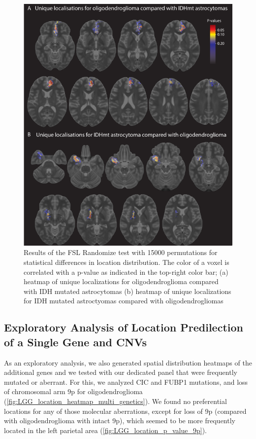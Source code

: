 \begin{figure}[htbp]
    \centering
    \includegraphics[width=\textwidth]{Figures/p_value_oligo_astro.png}
    \caption{Results of the FSL Randomize test with 15000 permutations for statistical
    differences in location distribution. The color of a voxel is correlated with
    a p-value as indicated in the top-right color bar; (a) heatmap of unique
    localizations for oligodendroglioma compared with IDH mutated astrocytomas (b) heatmap of unique localizations for IDH mutated astroctyomas
    compared with oligodendrogliomas}\label{fig:LGG_location_oligo_astro_p_value}
\end{figure}


\subsection{Exploratory Analysis of Location Predilection of a Single Gene and CNVs}

As an exploratory analysis, we also generated spatial distribution heatmaps of the additional genes and  we tested with our dedicated  panel that were frequently mutated or aberrant.
For this, we analyzed CIC and FUBP1 mutations, and loss of chromosomal arm 9p for oligodendroglioma (\cref{fig:LGG_location_heatmap_multi_genetics}).
We found no preferential locations for any of those molecular aberrations, except for loss of 9p (compared with oligodendroglioma with intact 9p), which seemed to be more frequently located in the left parietal area (\cref{fig:LGG_location_p_value_9p}).

